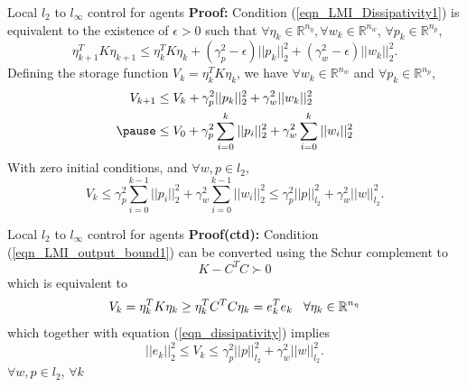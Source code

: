 \begin{frame}{Local $l_2$ to $l_{\infty}$ control for agents}
\textbf{Proof:}	
	Condition (\ref{eqn_LMI_Dissipativity1}) is equivalent to the existence of $\epsilon>0$ such that $\forall \eta_k \in \mathbb{R}^{n_\eta},\forall w_k \in \mathbb{R}^{n_w}$, $\forall p_k \in \mathbb{R}^{n_p}$,
	\begin{equation*}
	\eta_{k+1}^TK\eta_{k+1}\leq\eta_{k}^TK\eta_{k}+(\gamma_p^2-\epsilon) ||p_{k}||_2^2+(\gamma_w^2-\epsilon) ||w_{k}||_2^2.
	\end{equation*}
	\pause
	Defining the storage function  $V_k=\eta_k^TK\eta_k$, we have  $\forall w_k \in \mathbb{R}^{n_w}$ and $\forall p_k \in \mathbb{R}^{n_p}$, 
	\begin{equation*}
	\begin{split}
	V_{k+1}&\leq V_{k}+\gamma_p^2 ||p_{k}||_2^2+\gamma_w^2 ||w_{k}||_2^2\\
	\pause
	&\leq V_{0}+\gamma_p^2 \sum_{i=0}^{k}||p_{i}||_2^2+\gamma_w^2 \sum_{i=0}^{k}||w_{i}||_2^2
	\end{split}	
	\end{equation*}
	\pause
	With zero initial conditions, and $\forall w,p \in l_2$, 
	\begin{equation} \label{eqn_dissipativity}
	V_{k}\leq\gamma_p^2\sum_{i=0}^{k-1}||p_i||_2^2+\gamma_w^2\sum_{i=0}^{k-1}||w_i||_2^2\leq\gamma_p^2||p||_{l_2}^2+\gamma_w^2||w||_{l_2}^2. 
	\end{equation}
\end{frame}
\begin{frame}{Local $l_2$ to $l_{\infty}$ control for agents}
\textbf{Proof(ctd):} Condition (\ref{eqn_LMI_output_bound1}) can be converted using the Schur complement to
\begin{equation}
K-C^TC\succ0
\end{equation}
which is equivalent to 
\begin{equation*}
V_k=\eta_k^TK\eta_k\geq\eta_k^TC^TC\eta_k=e_k^Te_k \hspace{0.3cm}\forall \eta_k \in \mathbb{R}^{n_\eta}
\end{equation*}
which together with equation (\ref{eqn_dissipativity}) implies 
\begin{equation*}
||e_k||_2^2\leq V_k \leq \gamma_p^2||p||_{l_2}^2+\gamma_w^2||w||_{l_2}^2.  
\end{equation*}
$\forall w,p \in l_2$, $\forall k$
\end{frame}
